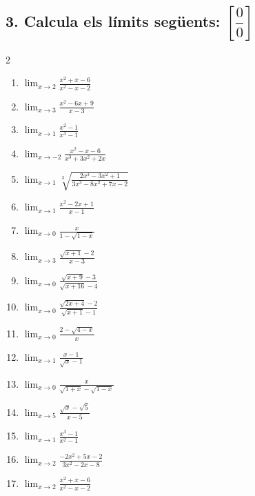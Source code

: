 \documentclass[12pt,a4paper]{article}
\begin{document}
\subsection*{3. Calcula els límits següents: $\left[\dfrac{0}{0}\right]$}
\begin{multicols}{2}
\begin{enumerate}[label=3.\arabic*.]
    \item $\displaystyle \lim_{x \to 2} \frac{x^2+x-6}{x^2-x-2}$
    \item $\displaystyle \lim_{x \to 3} \frac{x^2-6x+9}{x-3}$
    \item $\displaystyle \lim_{x \to 1} \frac{x^2-1}{x^3-1}$
    \item $\displaystyle \lim_{x \to -2} \frac{x^2-x-6}{x^3+3x^2+2x}$
    \item $\displaystyle \lim_{x \to 1} \sqrt[3]{\frac{2x^3-3x^2+1}{3x^3-8x^2+7x-2}}$
    \item $\displaystyle \lim_{x \to 1} \frac{x^2-2x+1}{x-1}$
    \item $\displaystyle \lim_{x \to 0} \frac{x}{1-\sqrt{1-x}}$
    \item $\displaystyle \lim_{x \to 3} \frac{\sqrt{x+1}-2}{x-3}$
    \item $\displaystyle \lim_{x \to 0} \frac{\sqrt{x+9}-3}{\sqrt{x+16}-4}$
    \item $\displaystyle \lim_{x \to 0} \frac{\sqrt{2x+4}-2}{\sqrt{x+1}-1}$
    \item $\displaystyle \lim_{x \to 0} \frac{2-\sqrt{4-x}}{x}$
    \item $\displaystyle \lim_{x \to 1} \frac{x-1}{\sqrt{x}-1}$
    \item $\displaystyle \lim_{x \to 0} \frac{x}{\sqrt{1+x}-\sqrt{1-x}}$
    \item $\displaystyle \lim_{x \to 5} \frac{\sqrt{x}-\sqrt{5}}{x-5}$
    \item $\displaystyle \lim_{x \to 1} \frac{x^3-1}{x^2-1}$
    \item $\displaystyle \lim_{x \to 2} \frac{-2x^2+5x-2}{3x^2-2x-8}$
    \item $\displaystyle \lim_{x \to 2} \frac{x^2+x-6}{x^2-x-2}$
\end{enumerate}
\end{multicols}

\end{document}
